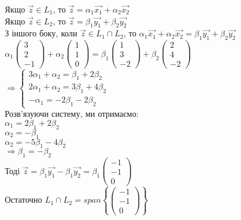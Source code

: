 \documentclass[a4paper, 14pt]{extarticle}
\def\bigline{\vspace{5mm}\\}
\begin{document}
	Якщо $\vec{z} \in L_1$, то $\vec{z} = \alpha_1 \vec{x_1} + \alpha_2 \vec{x_2}$\\
	Якщо $\vec{z} \in L_2$, то $\vec{z} = \beta_1 \vec{y_1} + \beta_2 \vec{y_2}$\\
	З іншого боку, коли $\vec{z} \in L_1 \cap L_2$, то $\alpha_1 \vec{x_1} + \alpha_2 \vec{x_2} = \beta_1 \vec{y_1} + \beta_2 \vec{y_2}$\\
	$\alpha_1 \begin{pmatrix} 3 \\ 2 \\ -1 \end{pmatrix} + \alpha_2 \begin{pmatrix} 1 \\ 1 \\ 0 \end{pmatrix} = \beta_1 \begin{pmatrix} 1 \\ 3 \\ -2 \end{pmatrix} + \beta_2 \begin{pmatrix} 2 \\ 4 \\ -2 \end{pmatrix}$\\
	$\Rightarrow \begin{cases}
	3 \alpha_1 + \alpha_2 = \beta_1 + 2 \beta_2 \\
	2 \alpha_1 + \alpha_2 = 3 \beta_1 + 4 \beta_2 \\
	- \alpha_1 = -2 \beta_1 - 2 \beta_2
	\end{cases}$\\
	Розв'язуючи систему, ми отримаємо:\\
	$\alpha_1 = 2\beta_1 + 2\beta_2$\\
	$\alpha_2 = -\beta_1$\\
	$\alpha_2 = -5\beta_1 - 4\beta_2$\\
	$\Rightarrow \beta_1 = -\beta_2$\\
	Тоді $\vec{z} =\beta_1 \vec{y_1} - \beta_1 \vec{y_2} = \beta_1 \begin{pmatrix} -1 \\ -1 \\ 0 \end{pmatrix}$\\
	Остаточно $L_1 \cap L_2 = span\left\{ \begin{pmatrix} -1 \\ -1 \\ 0 \end{pmatrix} \right\}$
	\bigline
	
\end{document}
